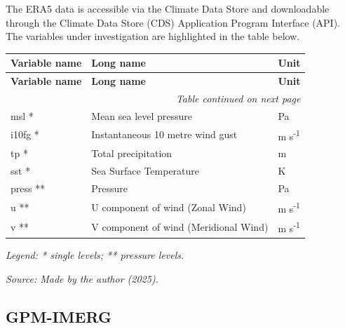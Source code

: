 The ERA5 data is accessible via the Climate Data Store and downloadable through the Climate Data Store (CDS) Application Program Interface (API). The variables under investigation are highlighted in the table below.



\begin{center}
	 \label{tab:era5_variables}
\end{center}

\begin{longtable}{p{3cm} p{8cm} p{2.5cm}}
	\toprule
	\textbf{Variable name} & \textbf{Long name} & \textbf{Unit} \\
	\midrule
	\endfirsthead
	
	\toprule
	\textbf{Variable name} & \textbf{Long name} & \textbf{Unit} \\
	\midrule
	\endhead
	
	\multicolumn{3}{r}{\textit{Table continued on next page}} \\
	\endfoot
	
	\bottomrule
	\endlastfoot
	
	msl *     & Mean sea level pressure                         & Pa \\
	i10fg *   & Instantaneous 10 metre wind gust                & m s\textsuperscript{-1} \\
	tp *      & Total precipitation                             & m \\
	sst *     & Sea Surface Temperature                          & K \\
	press **  & Pressure                                         & Pa \\
	u **      & U component of wind (Zonal Wind)                 & m s\textsuperscript{-1} \\
	v **      & V component of wind (Meridional Wind)            & m s\textsuperscript{-1} \\
\end{longtable}

\vspace{-1em}
\noindent\small\textit{Legend: * single levels; ** pressure levels.}

\vspace{1em}
\begin{center}
	\textit{Source: Made by the author (2025).}
\end{center}

\subsection{GPM-IMERG}

